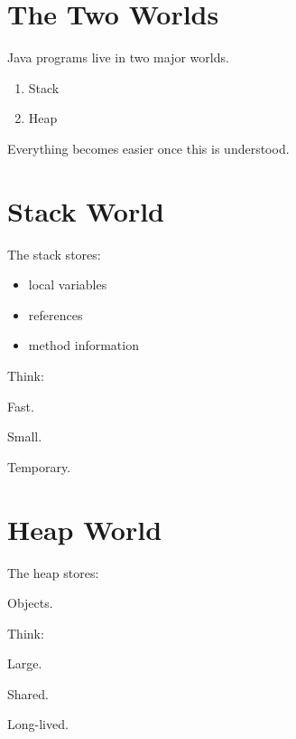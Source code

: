 \documentclass[11pt,a4paper]{book}
\begin{document}
\section{The Two Worlds}

Java programs live in two major worlds.

\begin{enumerate}
\item Stack
\item Heap
\end{enumerate}

Everything becomes easier once this is understood.


\section{Stack World}

\begin{idea}

The stack stores:

\begin{itemize}
\item local variables
\item references
\item method information
\end{itemize}

\end{idea}

Think:

Fast.

Small.

Temporary.


\section{Heap World}

\begin{idea}

The heap stores:

Objects.

\end{idea}

Think:

Large.

Shared.

Long-lived.

\end{document}
